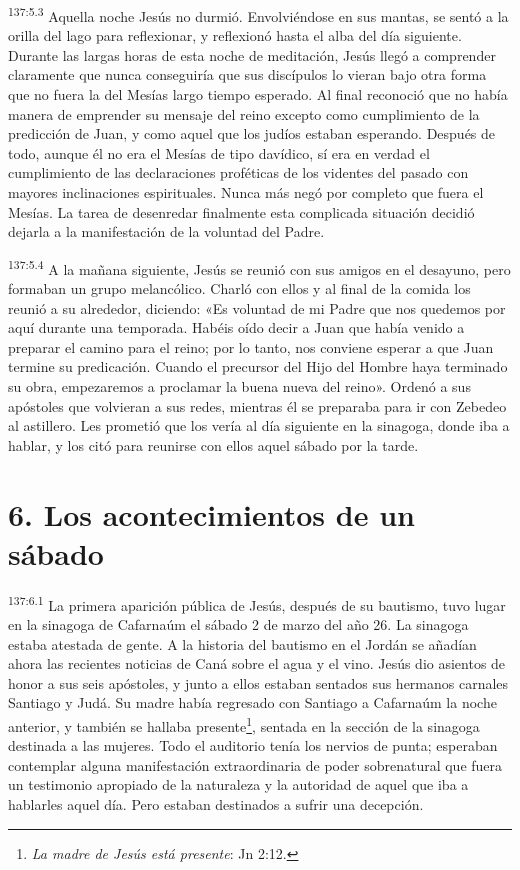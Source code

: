 \par
\textsuperscript{137:5.3} Aquella noche Jesús no durmió. Envolviéndose en sus mantas, se sentó a la orilla del lago para reflexionar, y reflexionó hasta el alba del día siguiente. Durante las largas horas de esta noche de meditación, Jesús llegó a comprender claramente que nunca conseguiría que sus discípulos lo vieran bajo otra forma que no fuera la del Mesías largo tiempo esperado. Al final reconoció que no había manera de emprender su mensaje del reino excepto como cumplimiento de la predicción de Juan, y como aquel que los judíos estaban esperando. Después de todo, aunque él no era el Mesías de tipo davídico, sí era en verdad el cumplimiento de las declaraciones proféticas de los videntes del pasado con mayores inclinaciones espirituales. Nunca más negó por completo que fuera el Mesías. La tarea de desenredar finalmente esta complicada situación decidió dejarla a la manifestación de la voluntad del Padre.

\par
\textsuperscript{137:5.4} A la mañana siguiente, Jesús se reunió con sus amigos en el desayuno, pero formaban un grupo melancólico. Charló con ellos y al final de la comida los reunió a su alrededor, diciendo: «Es voluntad de mi Padre que nos quedemos por aquí durante una temporada. Habéis oído decir a Juan que había venido a preparar el camino para el reino; por lo tanto, nos conviene esperar a que Juan termine su predicación. Cuando el precursor del Hijo del Hombre haya terminado su obra, empezaremos a proclamar la buena nueva del reino». Ordenó a sus apóstoles que volvieran a sus redes, mientras él se preparaba para ir con Zebedeo al astillero. Les prometió que los vería al día siguiente en la sinagoga, donde iba a hablar, y los citó para reunirse con ellos aquel sábado por la tarde.

\section*{6. Los acontecimientos de un sábado}
\par
\textsuperscript{137:6.1} La primera aparición pública de Jesús, después de su bautismo, tuvo lugar en la sinagoga de Cafarnaúm el sábado 2 de marzo del año 26. La sinagoga estaba atestada de gente. A la historia del bautismo en el Jordán se añadían ahora las recientes noticias de Caná sobre el agua y el vino. Jesús dio asientos de honor a sus seis apóstoles, y junto a ellos estaban sentados sus hermanos carnales Santiago y Judá. Su madre había regresado con Santiago a Cafarnaúm la noche anterior, y también se hallaba presente\footnote{\textit{La madre de Jesús está presente}: Jn 2:12.}, sentada en la sección de la sinagoga destinada a las mujeres. Todo el auditorio tenía los nervios de punta; esperaban contemplar alguna manifestación extraordinaria de poder sobrenatural que fuera un testimonio apropiado de la naturaleza y la autoridad de aquel que iba a hablarles aquel día. Pero estaban destinados a sufrir una decepción.

